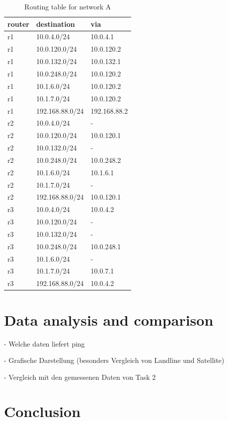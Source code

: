 \documentclass[parskip=full]{scrartcl}
\begin{document}
\begin{table}[hb]
	\centering

	\begin{tabular}{lll}
		\toprule
		\textbf{router} & \textbf{destination} & \textbf{via}  \\ \midrule
		r1 & 10.0.4.0/24 & 10.0.4.1 \\
		r1 & 10.0.120.0/24 & 10.0.120.2 \\
		r1 & 10.0.132.0/24 & 10.0.132.1 \\
		r1 & 10.0.248.0/24 & 10.0.120.2 \\
		r1 & 10.1.6.0/24 & 10.0.120.2 \\
		r1 & 10.1.7.0/24 & 10.0.120.2 \\
		r1 & 192.168.88.0/24 & 192.168.88.2\\
		\midrule
		r2 & 10.0.4.0/24 & - \\
		r2 & 10.0.120.0/24 & 10.0.120.1 \\
		r2 & 10.0.132.0/24 & - \\
		r2 & 10.0.248.0/24 & 10.0.248.2 \\
		r2 & 10.1.6.0/24 & 10.1.6.1 \\
		r2 & 10.1.7.0/24 & - \\
		r2 & 192.168.88.0/24 & 10.0.120.1\\
		\midrule
		r3 & 10.0.4.0/24 & 10.0.4.2 \\
		r3 & 10.0.120.0/24 & - \\
		r3 & 10.0.132.0/24 & - \\
		r3 & 10.0.248.0/24 & 10.0.248.1 \\
		r3 & 10.1.6.0/24 & - \\
		r3 & 10.1.7.0/24 & 10.0.7.1 \\
		r3 & 192.168.88.0/24 & 10.0.4.2\\
		\bottomrule
	\end{tabular}
	\caption{Routing table for network A}
	\label{tab:routing}
\end{table}

\section{Data analysis and comparison} \label{sec:data}
- Welche daten liefert ping

- Grafische Darstellung (besonders Vergleich von Landline und Satellite)

- Vergleich mit den gemessenen Daten von Task 2





\newpage
\section{Conclusion}


\printbibliography
\end{document}
